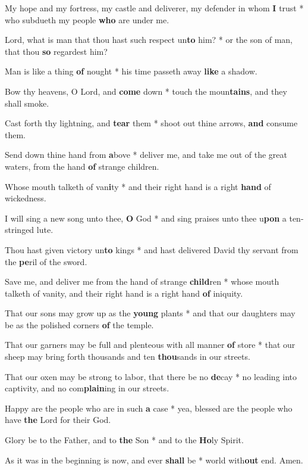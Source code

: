 \begin{multicols}{2}
	My hope and my fortress, my castle and deliverer, my defender in whom \textbf{I} trust * who subdueth my people \textbf{who} are under me.
	
	Lord, what is man that thou hast such respect un\textbf{to} him? * or the son of man, that thou \textbf{so} regardest him?
	
	Man is like a thing \textbf{of} nought * his time passeth away \textbf{like} a shadow.
	
	Bow thy heavens, O Lord, and \textbf{come} down * touch the moun\textbf{tains}, and they shall smoke.
	
	Cast forth thy lightning, and \textbf{tear} them * shoot out thine arrows, \textbf{and} consume them.
	
	Send down thine hand from \textbf{a}bove * deliver me, and take me out of the great waters, from the hand \textbf{of} strange children.
	
	Whose mouth talketh of van\textbf{i}ty * and their right hand is a right \textbf{hand} of wickedness.
	
	I will sing a new song unto thee, \textbf{O} God * and sing praises unto thee u\textbf{pon} a ten-stringed lute.
	
	Thou hast given victory un\textbf{to} kings * and hast delivered David thy servant from the \textbf{pe}ril of the sword.
	
	Save me, and deliver me from the hand of strange \textbf{child}ren * whose mouth talketh of vanity, and their right hand is a right hand \textbf{of} iniquity.
	
	That our sons may grow up as the \textbf{young} plants * and that our daughters may be as the polished corners \textbf{of} the temple.
	
	That our garners may be full and plenteous with all manner \textbf{of} store * that our sheep may bring forth thousands and ten \textbf{thou}sands in our streets.
	
	That our oxen may be strong to labor, that there be no \textbf{de}cay * no leading into captivity, and no com\textbf{plain}ing in our streets.
	
	Happy are the people who are in such \textbf{a} case * yea, blessed are the people who have \textbf{the} Lord for their God.
	
	Glory be to the Father, and to \textbf{the} Son * and to the \textbf{Ho}ly Spirit.
	
	As it was in the beginning is now, and ever \textbf{shall} be * world with\textbf{out} end. Amen.
\end{multicols}